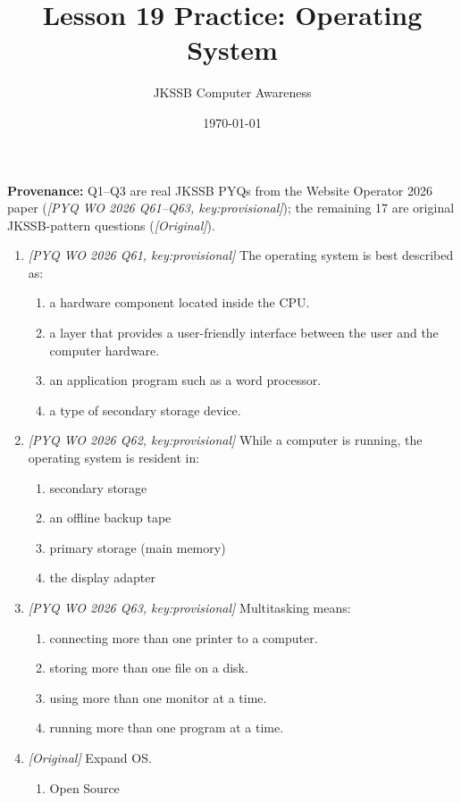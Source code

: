 \documentclass[11pt]{article}
\title{Lesson 19 Practice: Operating System}
\author{JKSSB Computer Awareness}
\date{\today}
\begin{document}
\maketitle
\noindent\textbf{Provenance:} Q1--Q3 are real JKSSB PYQs from the Website
Operator 2026 paper (\textit{[PYQ WO 2026 Q61--Q63, key:provisional]}); the
remaining 17 are original JKSSB-pattern questions (\textit{[Original]}).

\begin{enumerate}[label=\textbf{Q\arabic*.}, leftmargin=*]
\item \textit{[PYQ WO 2026 Q61, key:provisional]} The operating system is best
  described as:
  \begin{enumerate}[label=\Alph*.]
    \item a hardware component located inside the CPU.
    \item a layer that provides a user-friendly interface between the user and
      the computer hardware.
    \item an application program such as a word processor.
    \item a type of secondary storage device.
  \end{enumerate}
\item \textit{[PYQ WO 2026 Q62, key:provisional]} While a computer is running,
  the operating system is resident in:
  \begin{enumerate}[label=\Alph*.]
    \item secondary storage
    \item an offline backup tape
    \item primary storage (main memory)
    \item the display adapter
  \end{enumerate}
\item \textit{[PYQ WO 2026 Q63, key:provisional]} Multitasking means:
  \begin{enumerate}[label=\Alph*.]
    \item connecting more than one printer to a computer.
    \item storing more than one file on a disk.
    \item using more than one monitor at a time.
    \item running more than one program at a time.
  \end{enumerate}
\item \textit{[Original]} Expand OS.
  \begin{enumerate}[label=\Alph*.]
    \item Open Source

\end{enumerate}
\end{enumerate}
\end{document}

